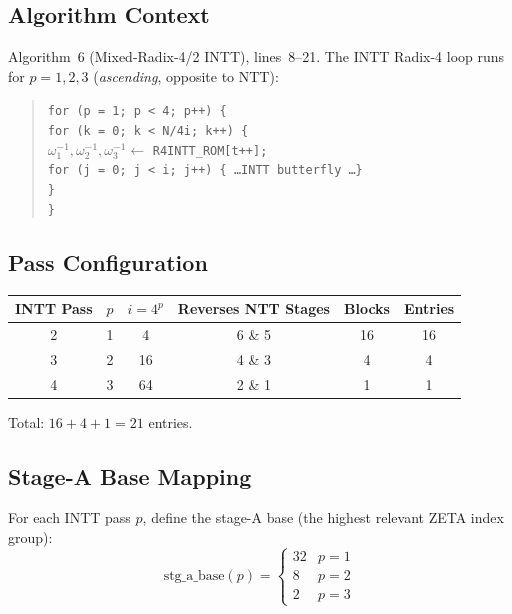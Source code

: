 \documentclass[11pt,a4paper]{article}
\begin{document}
\subsection{Algorithm Context}

Algorithm~6 (Mixed-Radix-4/2 INTT), lines~8--21. The INTT Radix-4 loop runs for $p = 1, 2, 3$ (\emph{ascending}, opposite to NTT):

\begin{quote}
\texttt{for (p = 1; p < 4; p++) \{}\\
\quad \texttt{for (k = 0; k < N/4i; k++) \{}\\
\quad\quad $\omega_1^{-1}, \omega_2^{-1}, \omega_3^{-1} \leftarrow$ \texttt{R4INTT\_ROM[t++];}\\
\quad\quad \texttt{for (j = 0; j < i; j++) \{ \ldots INTT butterfly \ldots \}}\\
\quad \texttt{\}}\\
\texttt{\}}
\end{quote}

\subsection{Pass Configuration}

\begin{center}
\renewcommand{\arraystretch}{1.3}
\begin{tabular}{cccccc}
  \toprule
  \textbf{INTT Pass} & $p$ & $i = 4^p$ & \textbf{Reverses NTT Stages} & \textbf{Blocks} & \textbf{Entries} \\
  \midrule
  2 & 1 & 4   & 6 \& 5 & 16 & 16 \\
  3 & 2 & 16  & 4 \& 3 & 4  & 4  \\
  4 & 3 & 64  & 2 \& 1 & 1  & 1  \\
  \bottomrule
\end{tabular}
\end{center}

Total: $16 + 4 + 1 = 21$ entries.

\subsection{Stage-A Base Mapping}

For each INTT pass $p$, define the stage-A base (the highest relevant ZETA index group):
\begin{equation}
  \text{stg\_a\_base}(p) =
  \begin{cases}
    32 & p = 1 \\
    8  & p = 2 \\
    2  & p = 3
  \end{cases}
  \label{eq:stg-a-base}
\end{equation}
\end{document}

